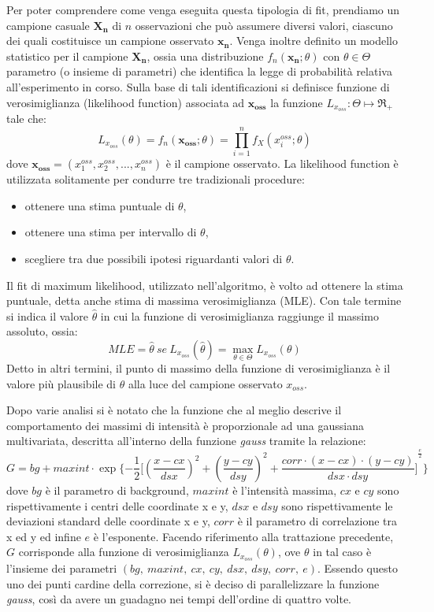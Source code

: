 Per poter comprendere come venga eseguita questa tipologia di fit, prendiamo un campione casuale $\mathbf{X_n}$ di $n$ osservazioni che può assumere diversi valori, ciascuno dei quali costituisce un campione osservato $\mathbf{x_n}$.
Venga inoltre definito un modello statistico per il campione $\mathbf{X_n}$, ossia una distribuzione $f_n (\mathbf{x_n};\theta)$ con $\theta \in \Theta$ parametro (o insieme di parametri) che identifica la legge di probabilità relativa all'esperimento in corso.
Sulla base di tali identificazioni si definisce funzione di verosimiglianza (likelihood function)
associata ad $\mathbf{x_{oss}}$ la funzione $L_{x_{oss}}: \Theta\longmapsto \Re_+$ tale che:
$$L_{x_{oss}}(\theta)=f_n (\mathbf{x_{oss}};\theta)=\prod_{i=1}^n f_X (x^{oss}_i;\theta) $$
dove $\mathbf{x_{oss}}=(x^{oss}_1, x^{oss}_2, ..., x^{oss}_n)$ è il campione osservato. 
La likelihood function è utilizzata solitamente per condurre tre tradizionali procedure:
\begin{itemize}
 \item ottenere una stima puntuale di $\theta$,
 \item ottenere una stima per intervallo di $\theta$,
 \item scegliere tra due possibili ipotesi riguardanti valori di $\theta$.
\end{itemize}
Il fit di maximum likelihood, utilizzato nell'algoritmo, è volto ad ottenere la stima puntuale, detta anche stima di massima verosimiglianza (MLE). 
Con tale termine si indica il valore $\hat{\theta}$ in cui la funzione di verosimiglianza raggiunge il massimo assoluto, ossia:
$$MLE = \hat{\theta}\ se\ L_{x_{oss}}(\hat{\theta})=\max_{\theta \in \Theta} L_{x_{oss}}(\theta)$$
Detto in altri termini, il punto di massimo della funzione di verosimiglianza è il valore più plausibile di $\theta$ alla luce del campione osservato $x_{oss}$.

Dopo varie analisi si è notato che la funzione che al meglio descrive il comportamento dei massimi di intensità è proporzionale ad una gaussiana multivariata, descritta all'interno della funzione \textit{gauss} tramite la relazione:
$$ G = bg + maxint \cdot \exp \bigg\{ {-\frac{1}{2} \bigg[{ (\frac{x-cx}{dsx})^2   +  (\frac{y-cy}{dsy})^2  +  \frac{corr \cdot (x-cx) \cdot (y-cy)}{dsx \cdot dsy} \bigg]}^{\frac{e}{2}}}\bigg\} $$
dove $bg$ è il parametro di background, $maxint$ è l'intensità massima, $cx$ e $cy$ sono rispettivamente i centri delle coordinate x e y, $dsx$ e $dsy$ sono rispettivamente le deviazioni standard delle coordinate x e y, $corr$ è il parametro di correlazione tra x ed y ed infine $e$ è l'esponente.
Facendo riferimento alla trattazione precedente, $G$ corrisponde alla funzione di verosimiglianza $L_{x_{oss}}(\theta)$, ove $\theta$ in tal caso è l'insieme dei parametri $(bg,\ maxint,\ cx,\ cy,\ dsx,\ dsy,\ corr,\ e)$.
Essendo questo uno dei punti cardine della correzione, si è deciso di parallelizzare la funzione \textit{gauss}, così da avere un guadagno nei tempi dell'ordine di quattro volte.

